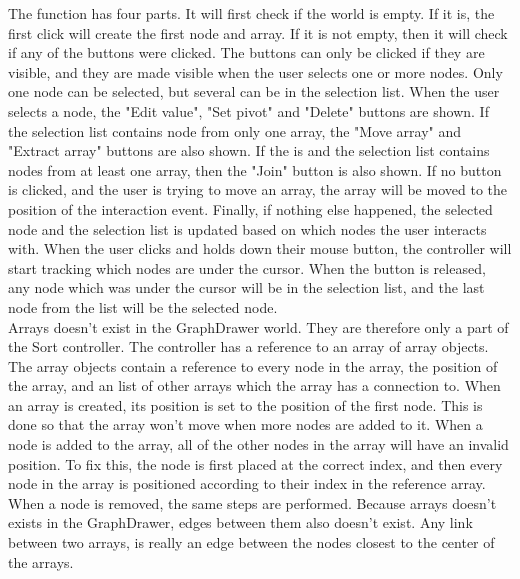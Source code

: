 The  function has four parts. It will first check if the world is empty. If it is, the first click will create the first node and array. If it is not empty, then it will check if any of the buttons were clicked. The buttons can only be clicked if they are visible, and they are made visible when the user selects one or more nodes. Only one node can be selected, but several can be in the selection list. When the user selects a node, the "Edit value", "Set pivot" and "Delete" buttons are shown. If the selection list contains node from only one array, the "Move array" and "Extract array" buttons are also shown. If the  is  and the selection list contains nodes from at least one array, then the "Join" button is also shown. If no button is clicked, and the user is trying to move an array, the array will be moved to the position of the interaction event. Finally, if nothing else happened, the selected node and the selection list is updated based on which nodes the user interacts with. When the user clicks and holds down their mouse button, the controller will start tracking which nodes are under the cursor. When the button is released, any node which was under the cursor will be in the selection list, and the last node from the list will be the selected node.
\\[11pt]
Arrays doesn't exist in the GraphDrawer world. They are therefore only a part of the Sort controller. The controller has a reference to an array of array objects. The array objects contain a reference to every node in the array, the position of the array, and an list of other arrays which the array has a connection to. When an array is created, its position is set to the position of the first node. This is done so that the array won't move when more nodes are added to it. When a node is added to the array, all of the other nodes in the array will have an invalid position. To fix this, the node is first placed at the correct index, and then every node in the array is positioned according to their index in the reference array. When a node is removed, the same steps are performed. Because arrays doesn't exists in the GraphDrawer, edges between them also doesn't exist. Any link between two arrays, is really an edge between the nodes closest to the center of the arrays. 